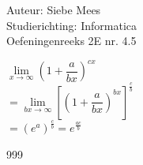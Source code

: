 \documentclass[a4paper]{article}
\begin{document}
  
\noindent \large Auteur: Siebe Mees \\
\noindent \large Studierichting: Informatica\\
\noindent \large Oefeningenreeks 2E nr. 4.5\\

\medskip

\normalsize

$\lim\limits_{x \rightarrow \infty} \left(  1 + \dfrac{a}{bx}  \right)^{cx} $\\ 

$ = \lim\limits_{bx \rightarrow \infty} \left[   \left(  1 + \dfrac{a}{bx}  \right) ^{bx} \right]^{\tfrac{c}{b}} $\\ 

$ = (e^a)^{\tfrac{c}{b}} = e ^{\tfrac{ac}{b}} $\\


\begin{thebibliography}{999}
\end{thebibliography}
\end{document}
